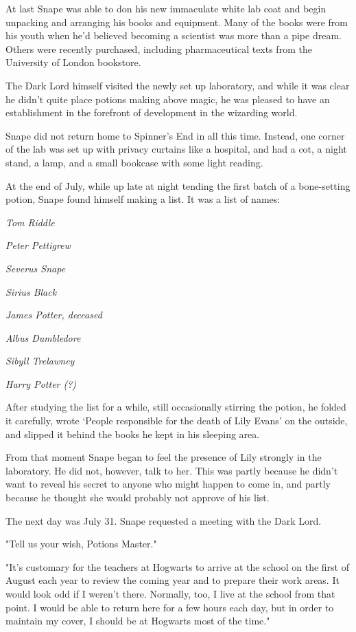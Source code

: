At last Snape was able to don his new immaculate white lab coat and begin unpacking and arranging his books and equipment. Many of the books were from his youth when he'd believed becoming a scientist was more than a pipe dream. Others were recently purchased, including pharmaceutical texts from the University of London bookstore.

The Dark Lord himself visited the newly set up laboratory, and while it was clear he didn't quite place potions making above magic, he was pleased to have an establishment in the forefront of development in the wizarding world.

Snape did not return home to Spinner's End in all this time. Instead, one corner of the lab was set up with privacy curtains like a hospital, and had a cot, a night stand, a lamp, and a small bookcase with some light reading.

At the end of July, while up late at night tending the first batch of a bone-setting potion, Snape found himself making a list. It was a list of names:

\emph{Tom Riddle}

\emph{Peter Pettigrew}

\emph{Severus Snape}

\emph{Sirius Black}

\emph{James Potter, deceased}

\emph{Albus Dumbledore}

\emph{Sibyll Trelawney}

\emph{Harry Potter (?)}

After studying the list for a while, still occasionally stirring the potion, he folded it carefully, wrote `People responsible for the death of Lily Evans' on the outside, and slipped it behind the books he kept in his sleeping area.

From that moment Snape began to feel the presence of Lily strongly in the laboratory. He did not, however, talk to her. This was partly because he didn't want to reveal his secret to anyone who might happen to come in, and partly because he thought she would probably not approve of his list.

The next day was July 31. Snape requested a meeting with the Dark Lord.

"Tell us your wish, Potions Master."

"It's customary for the teachers at Hogwarts to arrive at the school on the first of August each year to review the coming year and to prepare their work areas. It would look odd if I weren't there. Normally, too, I live at the school from that point. I would be able to return here for a few hours each day, but in order to maintain my cover, I should be at Hogwarts most of the time."

